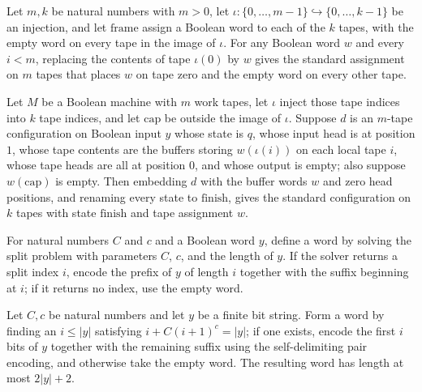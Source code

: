 \begin{theorem}
\label{Turing.cert_bank_word}
\leanok
{}
Let $m,k$ be natural numbers with $m>0$, let
$\iota:\{0,\ldots,m-1\}\hookrightarrow\{0,\ldots,k-1\}$ be an injection, and let
$\mathrm{frame}$ assign a Boolean word to each of the $k$ tapes, with the empty word on
every tape in the image of $\iota$. For any Boolean word $w$ and every $i<m$, replacing
the contents of tape $\iota(0)$ by $w$ gives the standard assignment on $m$ tapes that
places $w$ on tape zero and the empty word on every other tape.
\end{theorem}

\begin{theorem}
\label{Turing.cert_silent_words}
\leanok
{}
Let $M$ be a Boolean machine with $m$ work tapes, let $\iota$ inject those tape indices
into $k$ tape indices, and let $\mathrm{cap}$ be outside the image of $\iota$. Suppose
$d$ is an $m$-tape configuration on Boolean input $y$ whose state is $q$, whose input
head is at position $1$, whose tape contents are the buffers storing $w(\iota(i))$ on
each local tape $i$, whose tape heads are all at position $0$, and whose output is
empty; also suppose $w(\mathrm{cap})$ is empty. Then embedding $d$ with the buffer words
$w$ and zero head positions, and renaming every state to $\mathrm{finish}$, gives the
standard configuration on $k$ tapes with state $\mathrm{finish}$ and tape assignment
$w$.
\end{theorem}

\begin{definition}
\label{Turing.certSplitWord}
\leanok
{}
For natural numbers $C$ and $c$ and a Boolean word $y$, define a word by solving the
split problem with parameters $C$, $c$, and the length of $y$. If the solver returns a
split index $i$, encode the prefix of $y$ of length $i$ together with the suffix
beginning at $i$; if it returns no index, use the empty word.
\end{definition}

\begin{theorem}
\label{Turing.certSplitWord_length}
\leanok
{}
Let $C,c$ be natural numbers and let $y$ be a finite bit string. Form a word by finding
an $i\le |y|$ satisfying $i+C(i+1)^c=|y|$; if one exists, encode the first $i$ bits of
$y$ together with the remaining suffix using the self-delimiting pair encoding, and
otherwise take the empty word. The resulting word has length at most $2|y|+2$.
\end{theorem}

